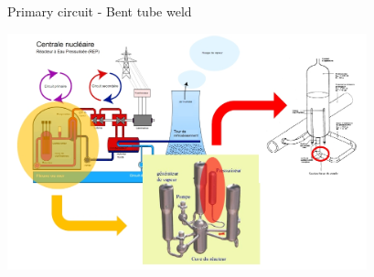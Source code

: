 \documentclass[9pt]{beamer}
\newcommand{\altx}{\usebeamercolor[fg]{alerted text}}
\begin{document}
%
%
%    
    
    \begin{frame}{Primary circuit - Bent tube weld}
    
    \begin{center}
        \includegraphics[width=10.4cm]{../Pics/schema_lep.jpg}
    \end{center}
    
    \end{frame}
    
\end{document}
